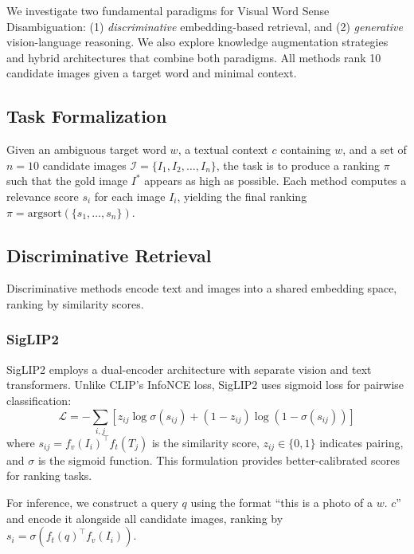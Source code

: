 \documentclass[11pt]{article}
\begin{document}
We investigate two fundamental paradigms for Visual Word Sense Disambiguation: (1) \textit{discriminative} embedding-based retrieval, and (2) \textit{generative} vision-language reasoning. We also explore knowledge augmentation strategies and hybrid architectures that combine both paradigms. All methods rank 10 candidate images given a target word and minimal context.

\subsection{Task Formalization}

Given an ambiguous target word $w$, a textual context $c$ containing $w$, and a set of $n=10$ candidate images $\mathcal{I} = \{I_1, I_2, \ldots, I_n\}$, the task is to produce a ranking $\pi$ such that the gold image $I^*$ appears as high as possible. Each method computes a relevance score $s_i$ for each image $I_i$, yielding the final ranking $\pi = \text{argsort}(\{s_1, \ldots, s_n\})$.

\subsection{Discriminative Retrieval}

Discriminative methods encode text and images into a shared embedding space, ranking by similarity scores.

\subsubsection{SigLIP2}

SigLIP2 \cite{zhai2023siglip} employs a dual-encoder architecture with separate vision and text transformers. Unlike CLIP's \cite{radford2021clip} InfoNCE loss, SigLIP2 uses sigmoid loss for pairwise classification:
\begin{equation}
\mathcal{L} = -\sum_{i,j} \left[ z_{ij} \log \sigma(s_{ij}) + (1-z_{ij}) \log (1 - \sigma(s_{ij})) \right]
\end{equation}
where $s_{ij} = f_v(I_i)^\top f_t(T_j)$ is the similarity score, $z_{ij} \in \{0, 1\}$ indicates pairing, and $\sigma$ is the sigmoid function. This formulation provides better-calibrated scores for ranking tasks.

For inference, we construct a query $q$ using the format ``this is a photo of a $w$. $c$'' and encode it alongside all candidate images, ranking by $s_i = \sigma(f_t(q)^\top f_v(I_i))$.
\end{document}
